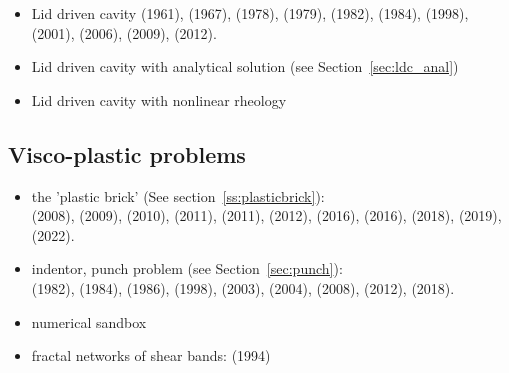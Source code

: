 \begin{itemize}
\item Lid driven cavity 
      \textcite{kawa61} (1961),
      \textcite{chor67} (1967),
      \textcite{shry78} (1978),
      \textcite{foth79} (1979),
      \textcite{ghgs82} (1982),
      \textcite{kost84} (1984),
      \textcite{bope98} (1998),
      \textcite{xika01} (2001),
      \textcite{brsa06} (2006),
      \textcite{ertu09} (2009),
      \textcite{tesk12} (2012).

\item Lid driven cavity with analytical solution (see Section~\ref{sec:ldc_anal})

\item Lid driven cavity with nonlinear rheology \cite{been80,svna18}
\end{itemize}

\subsection{Visco-plastic problems}

\begin{itemize}

\item the 'plastic brick' (See section~\ref{ss:plasticbrick}): \\
      \textcite{lemm08} (2008), 
      \textcite{qurj09} (2009), 
      \textcite{kaus10} (2010), 
      \textcite{mishin11} (2011), 
      \textcite{muso11} (2011), 
      \textcite{maie12} (2012), 
      \textcite{spmw16} (2016), 
      \textcite{kapb16} (2016), 
      \textcite{gltf18} (2018), 
      \textcite{frbt19} (2019),
      \textcite{mivg22} (2022).

\item indentor, punch problem (see Section~\ref{sec:punch}):\\
      \textcite{vidm82} (1982),
      \textcite{vidm84} (1984),
      \textcite{vimd86} (1986),
      \textcite{gepd98} (1998),
      \textcite{hukm03} (2003), 
      \textcite{fojd04} (2004), 
      \textcite{thfb08} (2008),
      \textcite{gerb12} (2012), 
      \textcite{gltf18} (2018).

\item numerical sandbox \cite{bube06,bube06,maie12,busa16,gltf18}

\item fractal networks of shear bands: \textcite{pohe94} (1994)

\end{itemize}


